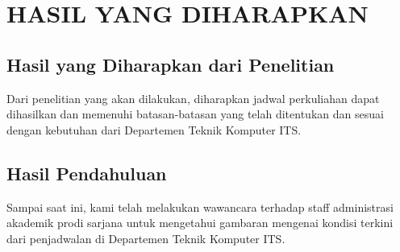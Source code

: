 \chapter{HASIL YANG DIHARAPKAN}

\section{Hasil yang Diharapkan dari Penelitian}

Dari penelitian yang akan dilakukan, diharapkan jadwal perkuliahan dapat dihasilkan dan memenuhi 
batasan-batasan yang telah ditentukan dan sesuai dengan kebutuhan dari Departemen Teknik Komputer ITS.

\section{Hasil Pendahuluan}

Sampai saat ini, kami telah melakukan wawancara terhadap staff administrasi akademik prodi sarjana untuk mengetahui 
gambaran mengenai kondisi terkini dari penjadwalan di Departemen Teknik Komputer ITS.
